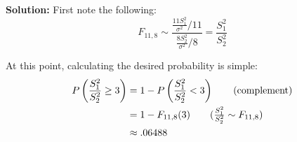 \documentclass{article}
\begin{document}
\noindent\textbf{Solution:} First note the following:
$$F_{11,8}\sim\frac{\frac{11S^2_1}{\sigma^2}/11}{\frac{8S^2_2}{\sigma^2}/8}=\frac{S^2_1}{S^2_2}$$

At this point, calculating the desired probability is simple:
\begin{align*}
  P\left(\frac{S^2_1}{S^2_2}\ge 3\right)&=1-P\left(\frac{S^2_1}{S^2_2}< 3\right)\tag{complement}\\
  &=1-F_{11,8}(3)\tag{$\frac{S^2_1}{S^2_2}\sim F_{11,8}$}\\
  &\approx.06488
\end{align*}
\end{document}
